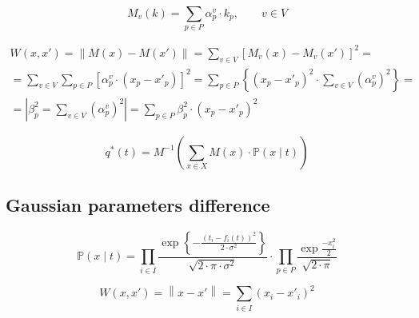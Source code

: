 \begin{equation*}
  M_v\left( k \right) = \sum_{p \in P} \alpha_p^v \cdot k_p, \qquad v \in V
\end{equation*}

\begin{equation*}
    \begin{split}
      W \left( x, x' \right)
      = \left\| M\left( x \right) - M\left( x' \right) \right\|
      = \sum_{v \in V} \left[
          M_v\left( x \right) - M_v\left( x' \right)
        \right]^2 = \\
      = \sum_{v \in V} \sum_{p \in P} \left[
          \alpha_p^v \cdot \left( x_p - x'_p \right)
        \right]^2
      = \sum_{p \in P} \left\{ \left( x_p - x'_p \right)^2
        \cdot \sum_{v \in V} \left( \alpha_p^v \right)^2 \right\} = \\
      = \left| \beta_p^2 = \sum_{v \in V} \left( \alpha_p^v \right)^2 \right|
      = \sum_{p \in P}
          \beta_p^2 \cdot \left( x_p - x'_p \right)^2
    \end{split}
\end{equation*}

\begin{equation*}
  q^* \left( t \right)
  = M^{-1} \left(
      \sum_{x \in X} M\left( x \right) \cdot \mathbb{P}\left( x \mid t \right)
    \right)
\end{equation*}

\subsection{Gaussian parameters difference}

\begin{equation*}
  \mathbb{P}\left( x \mid t \right)
  = \prod_{i \in I}
    \frac{\exp{\left\{- \frac{\left( t_i - f_i\left( t \right) \right)^2}
         {2 \cdot \sigma^2} \right\}}}{\sqrt{2 \cdot \pi \cdot \sigma^2}}
    \cdot
    \prod_{p \in P}
    \frac{\exp{\frac{-x_i^2}{2}}}{\sqrt{2 \cdot \pi}}
\end{equation*}

\begin{equation*}
  W \left( x, x' \right)
  = \left\| x - x' \right\|
  = \sum_{i \in I} \left( x_i - x'_i \right)^2
\end{equation*}
